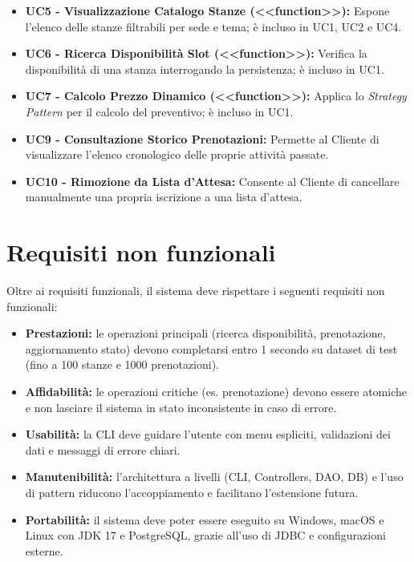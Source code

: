 \begin{itemize}
    \item \textbf{UC5 - Visualizzazione Catalogo Stanze (<<function>>):} Espone l'elenco delle stanze filtrabili per sede e tema; è incluso in UC1, UC2 e UC4.
    \item \textbf{UC6 - Ricerca Disponibilità Slot (<<function>>):} Verifica la disponibilità di una stanza interrogando la persistenza; è incluso in UC1.
    \item \textbf{UC7 - Calcolo Prezzo Dinamico (<<function>>):} Applica lo \textit{Strategy Pattern} per il calcolo del preventivo; è incluso in UC1.
    \item \textbf{UC9 - Consultazione Storico Prenotazioni:} Permette al Cliente di visualizzare l'elenco cronologico delle proprie attività passate.
    \item \textbf{UC10 - Rimozione da Lista d'Attesa:} Consente al Cliente di cancellare manualmente una propria iscrizione a una lista d'attesa.
\end{itemize}

\section{Requisiti non funzionali}

Oltre ai requisiti funzionali, il sistema deve rispettare i seguenti requisiti non funzionali:
\begin{itemize}
    \item \textbf{Prestazioni:} le operazioni principali (ricerca disponibilità, prenotazione, aggiornamento stato) devono completarsi entro 1 secondo su dataset di test (fino a 100 stanze e 1000 prenotazioni).
    \item \textbf{Affidabilità:} le operazioni critiche (es. prenotazione) devono essere atomiche e non lasciare il sistema in stato inconsistente in caso di errore.
    \item \textbf{Usabilità:} la CLI deve guidare l'utente con menu espliciti, validazioni dei dati e messaggi di errore chiari.
    \item \textbf{Manutenibilità:} l'architettura a livelli (CLI, Controllers, DAO, DB) e l'uso di pattern riducono l'accoppiamento e facilitano l'estensione futura.
    \item \textbf{Portabilità:} il sistema deve poter essere eseguito su Windows, macOS e Linux con JDK 17 e PostgreSQL, grazie all'uso di JDBC e configurazioni esterne.
\end{itemize}

